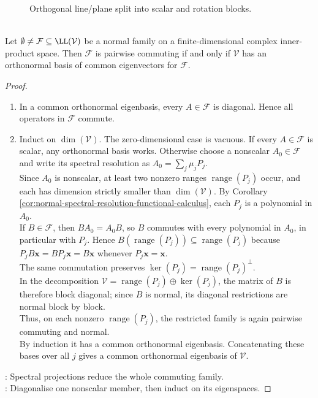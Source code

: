 \begin{figure}[H]
  \centering
  
  \caption{Orthogonal line/plane split into scalar and rotation blocks.}
  \label{fig:real-normal-block-structure}
\end{figure}

\begin{theorem} \label{thm:simultaneous-unitary-diagonalization-normal-family} \\
Let $\emptyset\neq\mathcal{F}\subseteq\LL(\mathcal{V})$ be a normal family on a finite-dimensional complex inner-product space. Then $\mathcal{F}$ is pairwise commuting if and only if $\mathcal{V}$ has an orthonormal basis of common eigenvectors for $\mathcal{F}$.
\begin{proof}
\begin{enumerate}[label=\roman*.]
\setlength{\itemsep}{0pt}
\item[$(\Leftarrow)$] In a common orthonormal eigenbasis, every $A\in\mathcal{F}$ is diagonal. Hence all operators in $\mathcal{F}$ commute.
\item[$(\Rightarrow)$] Induct on $\dim(\mathcal{V})$. The zero-dimensional case is vacuous. If every $A\in\mathcal{F}$ is scalar, any orthonormal basis works. Otherwise choose a nonscalar $A_0\in\mathcal{F}$ and write its spectral resolution as $A_0=\sum_j\mu_jP_j$.\\
Since $A_0$ is nonscalar, at least two nonzero ranges $\operatorname{range}(P_j)$ occur, and each has dimension strictly smaller than $\dim(\mathcal{V})$. By Corollary \ref{cor:normal-spectral-resolution-functional-calculus}, each $P_j$ is a polynomial in $A_0$.\\
If $B\in\mathcal{F}$, then $BA_0=A_0B$, so $B$ commutes with every polynomial in $A_0$, in particular with $P_j$. Hence $B(\operatorname{range}(P_j))\subseteq\operatorname{range}(P_j)$ because $P_jB\mathbf{x}=BP_j\mathbf{x}=B\mathbf{x}$ whenever $P_j\mathbf{x}=\mathbf{x}$.\\
The same commutation preserves $\ker(P_j)=\operatorname{range}(P_j)^{\perp}$.\\
In the decomposition $\mathcal{V}=\operatorname{range}(P_j)\oplus\ker(P_j)$, the matrix of $B$ is therefore block diagonal; since $B$ is normal, its diagonal restrictions are normal block by block.\\
Thus, on each nonzero $\operatorname{range}(P_j)$, the restricted family is again pairwise commuting and normal.\\
By induction it has a common orthonormal eigenbasis. Concatenating these bases over all $j$ gives a common orthonormal eigenbasis of $\mathcal{V}$.
\end{enumerate}
: Spectral projections reduce the whole commuting family.\\
: Diagonalise one nonscalar member, then induct on its eigenspaces.
\end{proof}
\end{theorem}


